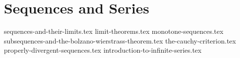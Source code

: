 \chapter{Sequences and Series}
{sequences-and-their-limits.tex}
{limit-theorems.tex}
{monotone-sequences.tex}
{subsequences-and-the-bolzano-wierstrass-theorem.tex}
{the-cauchy-criterion.tex}
{properly-divergent-sequences.tex}
{introduction-to-infinite-series.tex}
